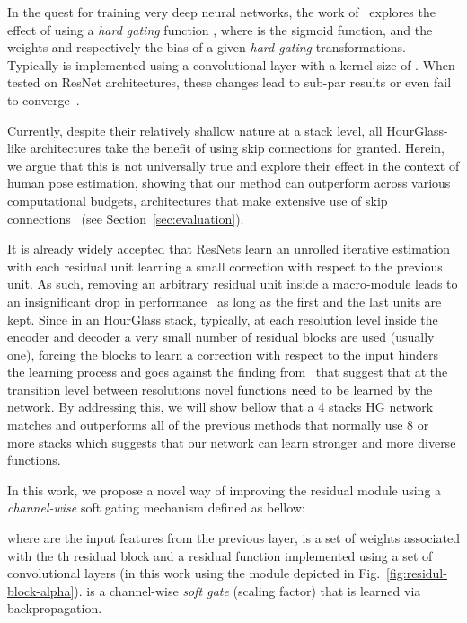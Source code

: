 \documentclass[a4paper, 10pt, conference]{ieeeconf}      \usepackage{FG2020}
\begin{document}
In the quest for training very deep neural networks, the work of~\cite{he2016identity,srivastava2015highway} explores the effect of using a \textit{hard gating} function , where  is the sigmoid function,  and  the weights and respectively the bias of a given \textit{hard gating} transformations. Typically  is implemented using a convolutional layer with a kernel size of . When tested on ResNet architectures, these changes lead to sub-par results or even fail to converge~\cite{he2016identity}.

Currently, despite their relatively shallow nature at a stack level, all HourGlass-like architectures take the benefit of using skip connections for granted. 
Herein, we argue that this is not universally true and explore their effect in the context of human pose estimation, showing that our method can outperform across various computational budgets, architectures that make extensive use of skip connections~\cite{newell2016stacked,tang2018cu} (see Section~\ref{sec:evaluation}).

It is already widely accepted that ResNets learn an unrolled iterative estimation~\cite{greff2016highway} with each residual unit learning a small correction with respect to the previous unit. As such, removing an arbitrary residual unit inside a macro-module leads to an insignificant drop in performance~\cite{jastrzkebski2017residual} as long as the first and the last units are kept. Since in an HourGlass stack, typically, at each resolution level inside the encoder and decoder a very small number of residual blocks are used (usually one), forcing the blocks to learn a correction with respect to the input hinders the learning process and goes against the finding from~\cite{jastrzkebski2017residual} that suggest that at the transition level between resolutions novel functions need to be learned by the network. By addressing this, we will show bellow that a 4 stacks HG network matches and outperforms all of the previous methods that normally use 8 or more stacks which suggests that our network can learn stronger and more diverse functions. 

In this work, we propose a novel way of improving the residual module using a \textit{channel-wise} soft gating mechanism defined as bellow:

where  are the input features from the previous layer,  is a set of weights associated with the th residual block and  a residual function implemented using a set of convolutional layers (in this work using the module depicted in Fig.~\ref{fig:residul-block-alpha}).  is a channel-wise \textit{soft gate} (scaling factor) that is learned via backpropagation. 
\end{document}
